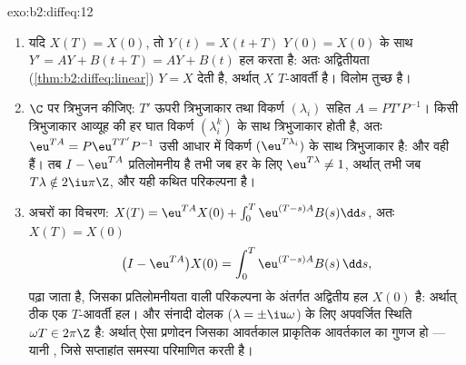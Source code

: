 \begin{solution}{exo:b2:diffeq:12}
\begin{enumerate}
  \item यदि $X(T) = X(0)$, तो $Y(t) = X(t + T)$ $Y(0) = X(0)$ के साथ $Y' =
        AY + B(t + T) = AY + B(t)$ हल करता है: अतः अद्वितीयता (\cref{thm:b2:diffeq:linear})
        $Y = X$ देती है, अर्थात् $X$ $T$-आवर्ती है। विलोम तुच्छ है।
  \item $\C$ पर त्रिभुजन कीजिए: $T'$ ऊपरी त्रिभुजाकार तथा विकर्ण $(\lambda_i)$
        सहित $A = PT'P^{-1}$। किसी त्रिभुजाकार आव्यूह की हर घात विकर्ण $(\lambda_i^k)$ के साथ
        त्रिभुजाकार होती है, अतः $\eu^{TA} = P\eu^{TT'}P^{-1}$ उसी आधार में विकर्ण $(\eu^{T\lambda_i})$ के साथ
        त्रिभुजाकार है: और वही  हैं। तब $I - \eu^{TA}$ प्रतिलोमनीय है
        तभी जब हर  के लिए $\eu^{T\lambda} \neq
        1$, अर्थात् तभी जब $T\lambda \notin
        2\iu\pi\Z$, और यही
        कथित परिकल्पना है।
  \item अचरों का विचरण: $X(T) = \eu^{TA}X(0) +
        \int_0^T\eu^{(T-s)A}B(s)\dd s$, अतः $X(T) = X(0)$
        \[
        \bigl(I - \eu^{TA}\bigr)X(0) =
        \int_0^{T}\eu^{(T-s)A}B(s)\,\dd s ,
        \]
        पढ़ा जाता है, जिसका प्रतिलोमनीयता वाली परिकल्पना के अंतर्गत
        अद्वितीय हल $X(0)$ है: अर्थात् ठीक एक $T$-आवर्ती हल। और संनादी
        दोलक ($\lambda =
        \pm\iu\omega$) के लिए अपवर्जित स्थिति $\omega T \in
        2\pi\Z$ है: अर्थात् ऐसा प्रणोदन
        जिसका आवर्तकाल प्राकृतिक आवर्तकाल का गुणज हो --- यानी ,
        जिसे सप्ताहांत समस्या परिमाणित करती है।
\end{enumerate}
\end{solution}


